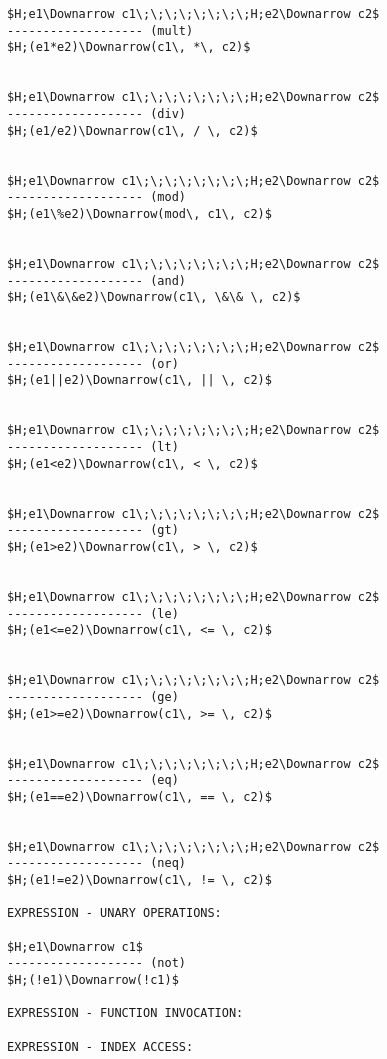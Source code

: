 \documentclass[11pt, a4paper]{article}
\begin{document}
\begin{lstlisting}
$H;e1\Downarrow c1\;\;\;\;\;\;\;\;H;e2\Downarrow c2$
------------------- (mult)
$H;(e1*e2)\Downarrow(c1\, *\, c2)$


$H;e1\Downarrow c1\;\;\;\;\;\;\;\;H;e2\Downarrow c2$
------------------- (div)
$H;(e1/e2)\Downarrow(c1\, / \, c2)$


$H;e1\Downarrow c1\;\;\;\;\;\;\;\;H;e2\Downarrow c2$
------------------- (mod)
$H;(e1\%e2)\Downarrow(mod\, c1\, c2)$


$H;e1\Downarrow c1\;\;\;\;\;\;\;\;H;e2\Downarrow c2$
------------------- (and)
$H;(e1\&\&e2)\Downarrow(c1\, \&\& \, c2)$


$H;e1\Downarrow c1\;\;\;\;\;\;\;\;H;e2\Downarrow c2$
------------------- (or)
$H;(e1||e2)\Downarrow(c1\, || \, c2)$


$H;e1\Downarrow c1\;\;\;\;\;\;\;\;H;e2\Downarrow c2$
------------------- (lt)
$H;(e1<e2)\Downarrow(c1\, < \, c2)$


$H;e1\Downarrow c1\;\;\;\;\;\;\;\;H;e2\Downarrow c2$
------------------- (gt)
$H;(e1>e2)\Downarrow(c1\, > \, c2)$


$H;e1\Downarrow c1\;\;\;\;\;\;\;\;H;e2\Downarrow c2$
------------------- (le)
$H;(e1<=e2)\Downarrow(c1\, <= \, c2)$


$H;e1\Downarrow c1\;\;\;\;\;\;\;\;H;e2\Downarrow c2$
------------------- (ge)
$H;(e1>=e2)\Downarrow(c1\, >= \, c2)$


$H;e1\Downarrow c1\;\;\;\;\;\;\;\;H;e2\Downarrow c2$
------------------- (eq)
$H;(e1==e2)\Downarrow(c1\, == \, c2)$


$H;e1\Downarrow c1\;\;\;\;\;\;\;\;H;e2\Downarrow c2$
------------------- (neq)
$H;(e1!=e2)\Downarrow(c1\, != \, c2)$

EXPRESSION - UNARY OPERATIONS:

$H;e1\Downarrow c1$
------------------- (not)
$H;(!e1)\Downarrow(!c1)$

EXPRESSION - FUNCTION INVOCATION:

EXPRESSION - INDEX ACCESS:
\end{lstlisting}
\end{document}
